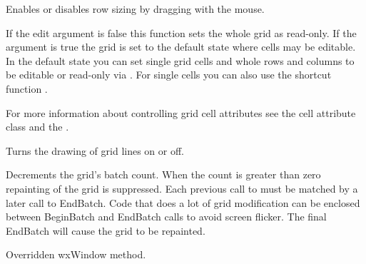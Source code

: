 
Enables or disables row sizing by dragging with the mouse.



\label{wxgridenableediting}


If the edit argument is false this function sets the whole grid as read-only. If the
argument is true the grid is set to the default state where cells may be editable. In the
default state you can set single grid cells and whole rows and columns to be editable or
read-only via
. For single
cells you can also use the shortcut function
.

For more information about controlling grid cell attributes see the
 cell attribute class and the
.



\label{wxgridenablegridlines}


Turns the drawing of grid lines on or off.



\label{wxgridendbatch}


Decrements the grid's batch count. When the count is greater than zero repainting of
the grid is suppressed. Each previous call to
 must be matched by a later call to
EndBatch. Code that does a lot of grid modification can be enclosed between
BeginBatch and EndBatch calls to avoid screen flicker. The final EndBatch will
cause the grid to be repainted.



\label{wxgridfit}


Overridden wxWindow method.



\label{wxgridforcerefresh}


